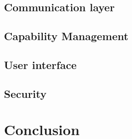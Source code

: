 \subsection{Communication layer}
\doit

\subsection{Capability Management}
\doit

\subsection{User interface}
\doit

\subsection{Security}
\doit

\section{Conclusion}
\doit




